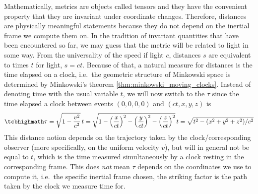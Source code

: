Mathematically, metrics are objects called tensors and they have the convenient property that they are invariant under coordinate changes. Therefore, distances are physically meaningful statements because they do not depend on the inertial frame we compute them on. In the tradition of invariant quantities that have been encountered so far, we may guess that the metric will be related to light in some way. From the universality of the speed if light $c$, distances $s$ are equivalent to times $t$ for light, $s = c t$. Because of that, a natural measure for distances is the time elapsed on a clock, i.e.~the geometric structure of Minkowski space is determined by Minkowski's theorem \ref{thm:minkowski_moving_clocks}. Instead of denoting time with the usual variable $t$, we will now switch to the  $\tau$ since the time elapsed a clock between events $(0, 0, 0, 0)$ and $(ct, x, y, z)$ is
\begin{equation}\label{eq:proper_time_uniform}
	\eqbox{
	\tau = \sqrt{1 - \frac{v^2}{c^2}} \, t = \sqrt{1 - \qty(\frac{x}{ct})^2 - \qty(\frac{y}{ct})^2 - \qty(\frac{z}{ct})^2} \, t = \sqrt{t^2 - (x^2 + y^2 + z^2) / c^2}
	}
\end{equation}
This distance notion depends on the trajectory taken by the clock/corresponding observer (more specifically, on the uniform velocity $v$), but will in general not be equal to $t$, which is the time measured simultaneously by a clock resting in the corresponding frame. This does \emph{not} mean $\tau$ depends on the coordinates we use to compute it, i.e.~the specific inertial frame chosen, the striking factor is the path taken by the clock we measure time for.



